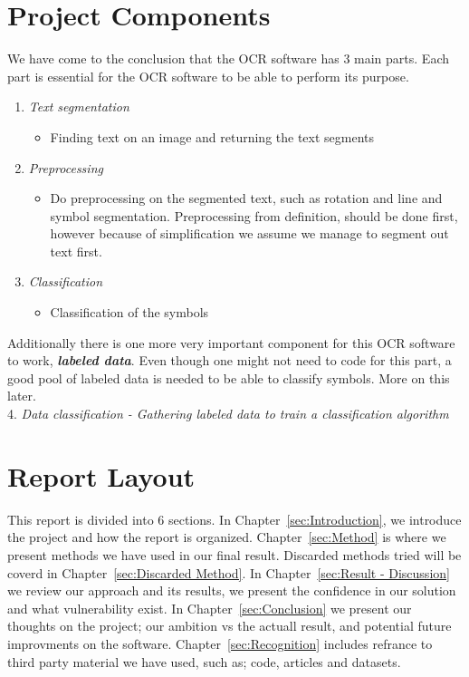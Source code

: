 \documentclass[Report.tex]{subfiles}
\begin{document}
\section{Project Components}
We have come to the conclusion that the OCR software has 3 main parts. Each
part is essential for the OCR software to be able to perform its purpose.
\begin{enumerate}
 \item{\textit{Text segmentation}}
 \begin{itemize}
  \item{Finding text on an image and returning the text segments}
 \end{itemize}
 \item{\textit{Preprocessing}}
 \begin{itemize}
  \item{Do preprocessing on the segmented text, such as rotation and line and
  symbol segmentation. Preprocessing from definition, should be done first,
  however because of simplification we assume we manage to segment out text
  first.}
 \end{itemize}
 \item{\textit{Classification}}
 \begin{itemize}
  \item{Classification of the symbols}
 \end{itemize}
\end{enumerate}

\begin{flushleft}
  Additionally there is one more very important component for this
  OCR software to work, \textit{\textbf{labeled data}}. Even though one might not
  need to code for this part, a good pool of labeled data is needed to be able to
  classify symbols. More on this later. \\
  4. \textit{Data classification - Gathering labeled data to train a classification algorithm}
\end{flushleft}


\section{Report Layout}
\label{subsec:Report Layout}
This report is divided into 6 sections. In
Chapter~\ref{sec:Introduction}, we introduce the project and how the report
is organized. Chapter~\ref{sec:Method} is where we present methods we have
used in our final result. Discarded methods tried will be coverd in Chapter~\ref{sec:Discarded Method}.
In Chapter~\ref{sec:Result - Discussion} we review our approach and
its results, we present the confidence in our solution and what vulnerability
exist. In Chapter~\ref{sec:Conclusion} we present our thoughts on the project;
our ambition vs the actuall result, and potential future improvments on the
software. Chapter~\ref{sec:Recognition} includes refrance to third party
material we have used, such as; code, articles and datasets.
\end{document}
